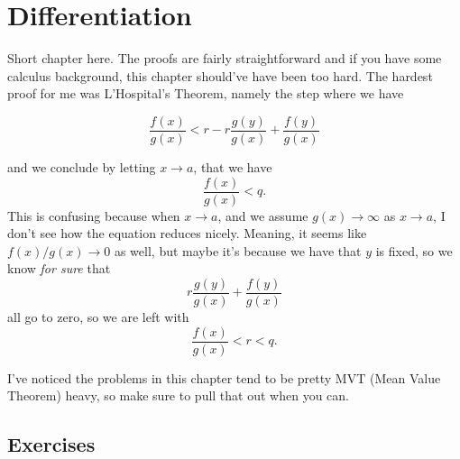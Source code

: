 \chapter{Differentiation}

Short chapter here. The proofs are fairly straightforward and if you have some calculus background, this chapter should've have been too hard.
The hardest proof for me was L'Hospital's Theorem, namely the step where we have

\begin{equation*}
  \frac{f(x)}{g(x)} < r - r \frac{g(y)}{g(x)} + \frac{f(y)}{g(x)}
\end{equation*}

and we conclude by letting $x \to a$, that we have
\begin{equation*}
  \frac{f(x)}{g(x)} < q.
\end{equation*}
This is confusing because when $x \to a$, and we assume $g(x) \to \infty$ as $x \to a$, I don't see how the equation reduces nicely.
Meaning, it seems like $f(x)/g(x) \to 0$ as well, but maybe it's because we have that $y$ is fixed, so we know \textit{for sure} that
\begin{equation*}
  r \frac{g(y)}{g(x)} + \frac{f(y)}{g(x)}
\end{equation*}
all go to zero, so we are left with
\begin{equation*}
  \frac{f(x)}{g(x)} < r < q.
\end{equation*}

I've noticed the problems in this chapter tend to be pretty MVT (Mean Value Theorem) heavy, so make sure to pull that out when you can.

\section{Exercises}


